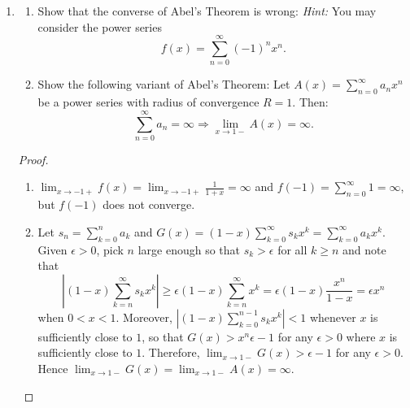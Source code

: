 \documentclass{article}
\begin{document}
\begin{enumerate}[font = \Large\bfseries\itshape\space, leftmargin = 3mm, labelsep = 3mm]
\begin{proof}
\textit{Claim:} For $n$ there exists polynomial $p_n$ such that $f^{(n)}(x) = p_n(\frac{1}{x}) e^{-\frac{1}{x^2}}$ if $x \neq 0$, and $f^{(n)}(x) = 0$ if $x = 0$.\\
First, the claim is true for $n = 0$.
If the claim is true for some $n$, i.e. $f^{(n)}(x) = p_n(\frac{1}{x}) e^{-\frac{1}{x^2}}$, then
$f^{(n+1)}(x) = \frac{2}{x^3}p_n(\frac{1}{x}) - \frac{1}{x^2}p_n(\frac{1}{x}) e^{-\frac{1}{x^2}} = p_{n+1}(x) e^{-\frac{1}{x^2}}$ for $x \neq 0$.
By lemma, $\lim_{x\rightarrow 0}f^{(n+1)}(x) = 0$.
Moreover, $f^{(n+1)}(0) = \lim_{x\rightarrow 0} \frac{f^{(n)}(x) - f^{(n)}(0)}{x - 0} = \lim_{x\rightarrow 0} \frac{f^{(n)}(x)}{x} = \lim_{x\rightarrow 0} \frac{p_n(\frac{1}{x})}{x} e^{-\frac{1}{x^2}} = 0$ by lemma.
Therefore, $f^{(n+1)}$ is continuous.
By induction hypothesis, $f \in C^\infty (\mathbb{R})$ and $f^{(n)}(0) = 0$ for any $n \geq 0$.
\end{proof}

\item
\begin{enumerate}[label=(\roman*)]
\item Show that the converse of Abel's Theorem is wrong:
\textit{Hint:} You may consider the power series
$$
f(x) = \sum_{n=0}^\infty (-1)^n x^n.
$$

\item
Show the following variant of Abel's Theorem:
Let $A(x) = \sum_{n=0}^\infty a_nx^n$ be a power series with radius of convergence $R = 1$.
Then:
$$
\sum_{n=0}^\infty a_n = \infty \Rightarrow \lim_{x\rightarrow 1-} A(x) = \infty.
$$
\end{enumerate}

\begin{proof}
\leavevmode
\begin{enumerate}[label = (\roman*)]
\item
$\lim_{x \rightarrow -1+} f(x) = \lim_{x\rightarrow -1+} \frac{1}{1+x} = \infty$ and $f(-1) = \sum_{n=0}^\infty 1 = \infty$,
but $f(-1)$ does not converge.

\item
Let $s_n = \sum_{k=0}^n a_k$ and $G(x) = (1-x) \sum_{k=0}^\infty s_k x^k = \sum_{k=0}^\infty a_k x^k$.
Given $\epsilon > 0$, pick $n$ large enough so that $s_k > \epsilon$ for all $k \geq n$ and note that
$$\left| (1-x) \sum_{k=n}^\infty s_k x^k \right| \geq \epsilon (1-x)\sum_{k=n}^\infty x^k = \epsilon (1-x) \frac{x^n}{1-x} = \epsilon x^n$$
when $0 < x < 1$.
Moreover, $|(1-x)\sum_{k=0}^{n-1} s_kx^k| < 1$ whenever $x$ is sufficiently close to $1$,
so that $G(x) > x^n\epsilon - 1$ for any $\epsilon > 0$ where $x$ is sufficiently close to $1$.
Therefore, $\lim_{x\rightarrow 1-} G(x) > \epsilon - 1$ for any $\epsilon > 0$.
Hence $\lim_{x\rightarrow 1-}G(x) = \lim_{x\rightarrow 1-}A(x) = \infty$.



\end{enumerate}
\end{proof}
\end{enumerate}
\end{document}
